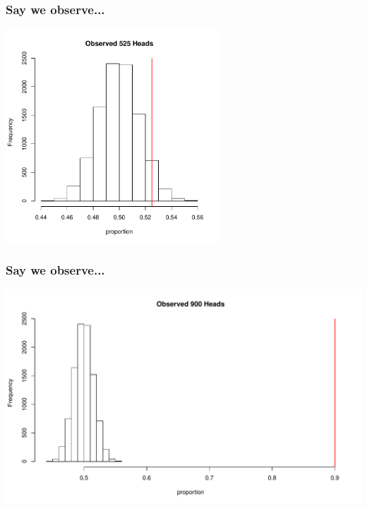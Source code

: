 \documentclass[handout]{beamer}
\begin{document}
\begin{frame}
\frametitle{Say we observe...}
\begin{center}
\includegraphics[width=0.6\textwidth]{figure/hist3}
\end{center}
\end{frame}


\begin{frame}
\frametitle{Say we observe...}
\begin{center}
\includegraphics[width=\textwidth]{figure/hist4}
\end{center}
\end{frame}
\end{document}
